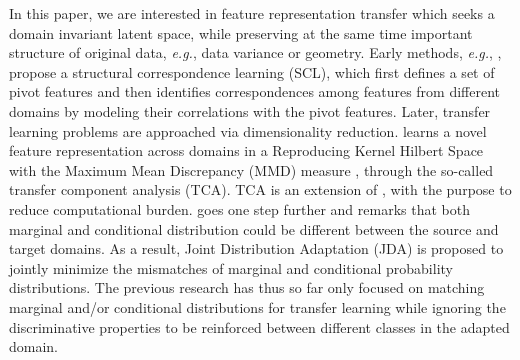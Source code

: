 \documentclass[10pt,twocolumn,letterpaper]{article}
\begin{document}
\begin{CJK*}{UTF8}{gkai}
In this paper, we are interested in feature representation transfer which seeks a domain invariant latent space, while preserving at the same time important structure of original data, \textit{e.g.}, data variance or geometry. Early methods, \textit{e.g.}, \cite{blitzer2006domain}, propose a structural correspondence learning (SCL), which first defines a set of pivot features and then identifies correspondences among features from different domains by modeling their correlations with the pivot features.  Later, transfer learning problems are approached via dimensionality reduction.  \cite{pan2011domain} learns a novel feature representation across domains in a Reproducing Kernel Hilbert Space  with the Maximum Mean Discrepancy (MMD) measure \cite{borgwardt2006integrating}, through the so-called transfer component analysis (TCA). TCA \cite{pan2011domain} is an extension of \cite{pan2008transfer}, with the purpose to reduce computational burden.  \cite{long2013transfer} goes one step further and remarks that both marginal and conditional distribution could be different between the source and target domains. As a result,  Joint Distribution Adaptation (JDA) is proposed to jointly minimize the mismatches of marginal and conditional probability  distributions. The previous research has thus so far only focused on matching marginal and/or conditional distributions for transfer learning while ignoring the discriminative properties to be reinforced between different classes in the adapted domain.  
% 
% 



\end{CJK*}
\end{document}
